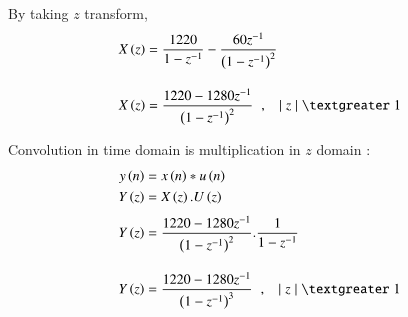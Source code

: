 \documentclass[journal,12pt,onecolumn]{IEEEtran}
\theoremstyle{remark}
\begin{document}
	By taking $z$ transform,
	\begin{align}
		X\brak z &= \dfrac{1220}{1 - z^{-1}} - \dfrac{60 z^{-1}}{\brak{1 - z^{-1}}^2} \\[10pt]
		X\brak z &= \dfrac{1220 - 1280 z^{-1}}{\brak{1 - z^{-1}}^2} \hspace{0.2cm}, \hspace{0.3cm}\lvert \hspace{0.1cm} z \hspace{0.1cm}\rvert \hspace{0.1cm} \textgreater \hspace{0.1cm} 1 
	\end{align}
	
	
	Convolution in time domain is multiplication in $z$ domain :
	\begin{align}
		y\brak n &= x\brak n \ast u\brak n\\
		Y\brak z &= X\brak z . U\brak z\\[3pt]	
		Y\brak z &=  \dfrac{1220 - 1280 z^{-1}}{\brak{1 - z^{-1}}^2}.\dfrac{1}{1 - z^{-1}} \\[10pt]
		Y\brak z &= \dfrac{1220 - 1280 z^{-1}}{\brak{1 - z^{-1}}^3} \hspace{0.2cm}, \hspace{0.3cm}\lvert \hspace{0.1cm} z \hspace{0.1cm}\rvert \hspace{0.1cm} \textgreater \hspace{0.1cm} 1
	\end{align}
	
\end{document}
